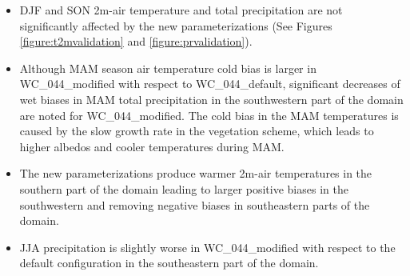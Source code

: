 \documentclass[a0b,landscape]{a0poster}
\begin{document}
\begin{multicols*}{4}
\noindent
\begin{minipage}[t]{\linewidth}

\end{minipage}


\begin{itemize}
  \item DJF and SON 2m-air temperature and total precipitation are not significantly
  affected by the new parameterizations (See Figures \ref{figure:t2mvalidation} and \ref{figure:prvalidation}).
  \item Although MAM season air temperature cold bias is larger in WC\_044\_modified with respect to WC\_044\_default,
  significant decreases of wet biases in MAM total precipitation in the southwestern part of the domain are noted for  WC\_044\_modified.
  The cold bias in the MAM temperatures is caused by the slow growth rate in the vegetation scheme, which leads to higher albedos and cooler temperatures during MAM.
  \item The new parameterizations produce warmer 2m-air temperatures in the southern part
  of the domain leading to larger positive biases in the southwestern and removing negative biases in
  southeastern parts of the domain.
  \item JJA precipitation is slightly worse in WC\_044\_modified with respect to
  the default configuration in the southeastern part of the domain.
\end{itemize}


\end{multicols*}
\end{document}
